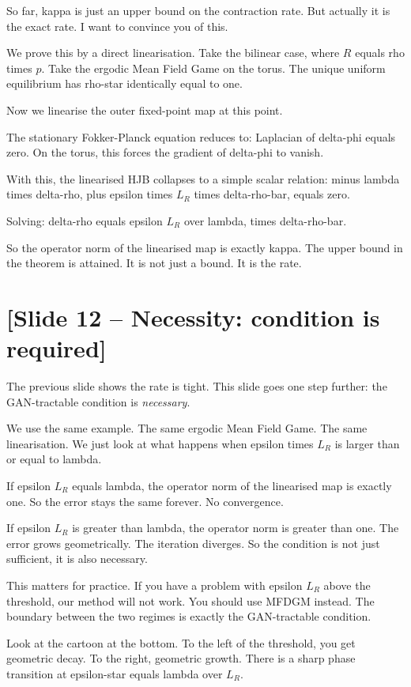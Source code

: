 \documentclass[11pt]{article}
\begin{document}
So far, kappa is just an upper bound on the contraction rate. But actually
it is the exact rate. I want to convince you of this.

We prove this by a direct linearisation. Take the bilinear case, where $R$
equals rho times $p$. Take the ergodic Mean Field Game on the torus. The
unique uniform equilibrium has rho-star identically equal to one.

Now we linearise the outer fixed-point map at this point.

The stationary Fokker-Planck equation reduces to: Laplacian of delta-phi
equals zero. On the torus, this forces the gradient of delta-phi to vanish.

With this, the linearised HJB collapses to a simple scalar relation:
minus lambda times delta-rho, plus epsilon times $L_R$ times delta-rho-bar,
equals zero.

Solving: delta-rho equals epsilon $L_R$ over lambda, times delta-rho-bar.

So the operator norm of the linearised map is exactly kappa. The upper
bound in the theorem is attained. It is not just a bound. It is the
rate.

\section*{[Slide 12 -- Necessity: condition is required]}

The previous slide shows the rate is tight. This slide goes one step further:
the GAN-tractable condition is \emph{necessary}.

We use the same example. The same ergodic Mean Field Game. The same
linearisation. We just look at what happens when epsilon times $L_R$ is
larger than or equal to lambda.

If epsilon $L_R$ equals lambda, the operator norm of the linearised map is
exactly one. So the error stays the same forever. No convergence.

If epsilon $L_R$ is greater than lambda, the operator norm is greater than
one. The error grows geometrically. The iteration diverges. So the
condition is not just sufficient, it is also necessary.

This matters for practice. If you have a problem with epsilon $L_R$ above
the threshold, our method will not work. You should use MFDGM instead.
The boundary between the two regimes is exactly the GAN-tractable condition.

Look at the cartoon at the bottom. To the left of the threshold, you get
geometric decay. To the right, geometric growth. There is a sharp phase
transition at epsilon-star equals lambda over $L_R$.
\end{document}
